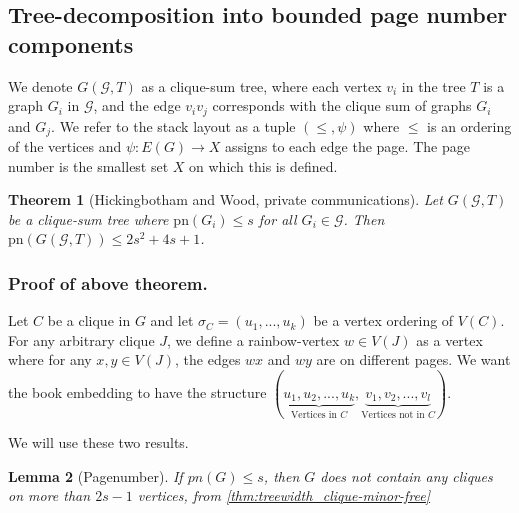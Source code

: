 \documentclass[]{article}
\newcommand{\pn}{\text{pn}}
\newtheorem{theorem}{Theorem}
\newtheorem{lemma}[theorem]{Lemma}
\theoremstyle{definition}
\numberwithin{theorem}{section}
\numberwithin{equation}{section}
\begin{document}
\subsection{Tree-decomposition into bounded page number components}\label{ssec:Clique_sum_Pagenumber_bound}
We denote $G(\mathcal{G}, T)$ as a clique-sum tree, where each vertex $v_i$ in the tree $T$ is a graph $G_i$ in $\mathcal{G}$, and the edge $v_iv_j$ corresponds with the clique sum of graphs $G_i$ and $G_j$. We refer to the stack layout as a tuple $(\leq , \psi)$ where $\leq$ is an ordering of the vertices and $\psi : E(G) \rightarrow X$ assigns to each edge the page. The page number is the smallest set $X$ on which this is defined. 
\begin{theorem}[Hickingbotham and Wood, private communications]\label{thm:clique_sum_pagenumber_bound}
	Let $G(\mathcal{G}, T)$ be a clique-sum tree where $\pn(G_i) \leq s$ for all $G_i \in \mathcal{G}$. Then $\pn(G(\mathcal{G}, T)) \leq 2s^2 + 4s + 1$.  
\end{theorem}

\subsubsection{Proof of above theorem.}
Let $C$ be a clique in $G$ and let $\sigma_C = (u_1, ... , u_k)$ be a vertex ordering of $V(C)$. For any arbitrary clique $J$, we define a rainbow-vertex $w \in V(J)$ as a vertex where for any $x, y \in V(J)$, the edges $wx$ and $wy$ are on different pages. We want the book embedding to have the structure $(\underbrace{u_1, u_2, ..., u_k}_{\text{Vertices in } C}, \underbrace{v_1, v_2, ..., v_l}_{\text{Vertices not in }C})$.

We will use these two results.
\begin{lemma}[Pagenumber]
	If $pn(G) \leq s$, then $G$ does not contain any cliques on more than $2s-1$ vertices, from \cref{thm:treewidth_clique-minor-free}
\end{lemma}
\end{document}
